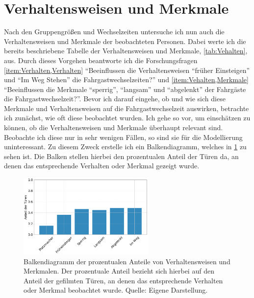 \section{Verhaltensweisen und Merkmale} \label{Verhalten}
Nach den Gruppengrößen und Wechselzeiten untersuche ich nun auch die Verhaltensweisen und Merkmale der beobachteten Personen. Dabei werte ich die bereits beschriebene Tabelle der Verhaltensweisen und Merkmale, \tablename \ref{tab:Vehalten}, aus. Durch dieses Vorgehen beantworte ich die Forschungsfragen \ref{item:Verhalten,Verhalten} "`Beeinflussen die Verhaltensweisen "`früher Einsteigen"' und "`Im Weg Stehen"' die Fahrgastwechselzeiten?"' und \ref{item:Vehalten,Merkmale} "`Beeinflussen die Merkmale "`sperrig"', "`langsam"' und "`abgelenkt"' der Fahrgäste die Fahrgastwechselzeit?"'. Bevor ich darauf eingehe, ob und wie sich diese Merkmale und Verhaltensweisen auf die Fahrgastwechselzeit auswirken, betrachte ich zunächst, wie oft diese beobachtet wurden. Ich gehe so vor, um einschätzen zu können, ob die Verhaltensweisen und Merkmale überhaupt relevant sind. Beobachte ich diese nur in sehr wenigen Fällen, so sind sie für die Modellierung uninteressant. Zu diesem Zweck erstelle ich ein Balkendiagramm, welches in \figurename \ref{fig:BalkenVerhalten} zu sehen ist. Die Balken stellen hierbei den prozentualen Anteil der Türen da, an denen das entsprechende Verhalten oder Merkmal gezeigt wurde.
\begin{figure}[H]
	\centering
		\includegraphics[width=0.6\textwidth]{pictures/data_evaluation/behavior/counts_behavoirs.png}
	\caption{Balkendiagramm der prozentualen Anteile von Verhaltensweisen und Merkmalen. Der prozentuale Anteil bezieht sich hierbei auf den Anteil der gefilmten Türen, an denen das entsprechende Verhalten oder Merkmal beobachtet wurde. Quelle: Eigene Darstellung.}
	\label{fig:BalkenVerhalten}
\end{figure}
